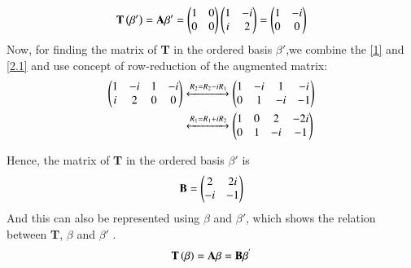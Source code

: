 \documentclass[journal,12pt,twocolumn]{IEEEtran}
\begin{document}
\begin{multline}
\textbf{T}\left(\beta'\right)  = \mathbf{A}\beta'= \begin{pmatrix}1 & 0 \\ 0 & 0 \end{pmatrix}\begin{pmatrix}1 & -i \\ i & 2\end{pmatrix}=\begin{pmatrix} 1 & -i \\ 0 & 0\end{pmatrix} \label{2.1}
\end{multline}
Now, for finding the matrix of \textbf{T} in the ordered basis $\beta'$,we combine the \ref{1} and \ref{2.1}  and  use concept of row-reduction of  the augmented matrix:
\begin{align}
\begin{pmatrix}1&-i& 1 & -i \\ i& 2 & 0 & 0 \end{pmatrix} &\xleftrightarrow{R_2 = R_2 - iR_1}\begin{pmatrix}1&-i&1 & -i  \\ 0 &1 & -i & -1\end{pmatrix}\\
&\xleftrightarrow{R_1=R_1 +iR_2}\begin{pmatrix}1 &0&2 & -2i\\0 &1 &-i &-1 \\ \end{pmatrix}
\end{align}

Hence, the matrix of \textbf{T} in the ordered basis $\beta'$ is
\begin{align}
\textbf{B} = \begin{pmatrix}2 & 2i \\ -i & -1\end{pmatrix}
\end{align}
And this can also be represented using   $\beta$  and $\beta'$, which shows the relation between \textbf{T}, $\beta$  and $\beta'$ .
\begin{align}
\textbf{T}\left(\mathbf{\beta}\right) =\mathbf{\textbf{A}}\mathbf{\beta} =\mathbf{\textbf{B}}\mathbf{\beta^{'}}   
\end{align}
\end{document}
